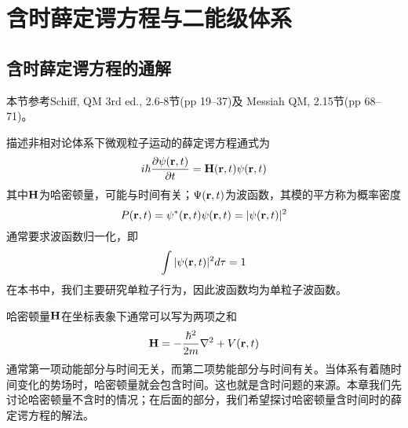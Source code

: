 
\chapter{含时薛定谔方程与二能级体系}
\label{cpt:1}
\section{含时薛定谔方程的通解}
\begin{framed}
本节参考Schiff, QM 3rd ed., 2.6-8节(pp 19--37)及 Messiah QM, 2.15节(pp 68--71)。
\end{framed}

描述非相对论体系下微观粒子运动的薛定谔方程通式为
\begin{equation}\label{eqn:tdsefull}
i\hbar \dfrac{\partial \psi(\bm{\mathrm{r}},t)}{\partial t}=\bm{\mathrm{H}}(\bm{\mathrm{r}},t) \psi(\bm{\mathrm{r}},t)
\end{equation}
其中$ \bm{\mathrm{H}} $为哈密顿量，可能与时间有关；$ \Psi(\bm{\mathrm{r}},t) $为波函数，其模的平方称为概率密度
\begin{equation}\label{key}
P(\bm{\mathrm{r}},t)=\psi^*(\bm{\mathrm{r}},t)\psi(\bm{\mathrm{r}},t)=|\psi(\bm{\mathrm{r}},t)|^2
\end{equation}
通常要求波函数归一化，即
\begin{equation}\label{key}
\int |\psi(\bm{\mathrm{r}},t)|^2d\tau=1
\end{equation}
在本书中，我们主要研究单粒子行为，因此波函数均为单粒子波函数。

哈密顿量$ \bm{\mathrm{H}} $在坐标表象下通常可以写为两项之和
\begin{equation}\label{key}
\bm{\mathrm{H}}=-\dfrac{\hbar^2}{2m}\nabla^2+V(\bm{\mathrm{r}},t)
\end{equation}
通常第一项动能部分与时间无关，而第二项势能部分与时间有关。当体系有着随时间变化的势场时，哈密顿量就会包含时间。这也就是含时问题的来源。本章我们先讨论哈密顿量不含时的情况；在后面的部分，我们希望探讨哈密顿量含时间时的薛定谔方程的解法。


